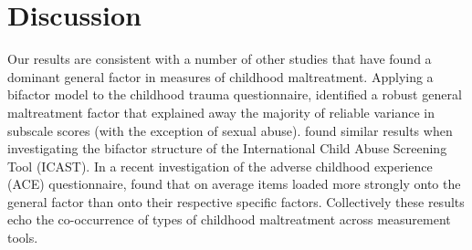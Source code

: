 \documentclass[letterpaper,man,natbib]{apa6}  %
\begin{document}
\section{Discussion}




Our results are consistent with a number of other studies that have found a dominant general factor in measures of childhood maltreatment. Applying a bifactor model to the childhood trauma questionnaire, \cite{spinhoven2014childhood} identified a robust general maltreatment factor that explained away the majority of reliable variance in subscale scores (with the exception of sexual abuse). \cite{meinck2021factor} found similar results when investigating the bifactor structure of the International Child Abuse Screening Tool (ICAST). In a recent investigation of the adverse childhood experience (ACE) questionnaire, \cite{dobson2021latent} found that on average items loaded more strongly onto the general factor than onto their respective specific factors. Collectively these results echo the co-occurrence of types of childhood maltreatment across measurement tools. 
\end{document}
